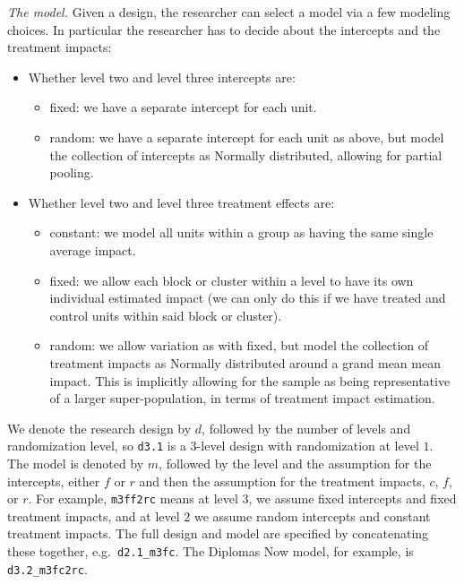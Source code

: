 \documentclass[
]{article}
\providecommand{\tightlist}{%
  \setlength{\itemsep}{0pt}\setlength{\parskip}{0pt}}
\begin{document}
\emph{The model.} Given a design, the researcher can select a model via
a few modeling choices. In particular the researcher has to decide about
the intercepts and the treatment impacts:

\begin{itemize}
\tightlist
\item
  Whether level two and level three intercepts are:

  \begin{itemize}
  \tightlist
  \item
    fixed: we have a separate intercept for each unit.
  \item
    random: we have a separate intercept for each unit as above, but
    model the collection of intercepts as Normally distributed, allowing
    for partial pooling.
  \end{itemize}
\item
  Whether level two and level three treatment effects are:

  \begin{itemize}
  \tightlist
  \item
    constant: we model all units within a group as having the same
    single average impact.
  \item
    fixed: we allow each block or cluster within a level to have its own
    individual estimated impact (we can only do this if we have treated
    and control units within said block or cluster).
  \item
    random: we allow variation as with fixed, but model the collection
    of treatment impacts as Normally distributed around a grand mean
    mean impact. This is implicitly allowing for the sample as being
    representative of a larger super-population, in terms of treatment
    impact estimation.
  \end{itemize}
\end{itemize}

We denote the research design by \(d\), followed by the number of levels
and randomization level, so \texttt{d3.1} is a \(3\)-level design with
randomization at level \(1\). The model is denoted by \(m\), followed by
the level and the assumption for the intercepts, either \(f\) or \(r\)
and then the assumption for the treatment impacts, \(c\), \(f\), or
\(r\). For example, \texttt{m3ff2rc} means at level \(3\), we assume
fixed intercepts and fixed treatment impacts, and at level \(2\) we
assume random intercepts and constant treatment impacts. The full design
and model are specified by concatenating these together,
e.g.~\texttt{d2.1\_m3fc}. The Diplomas Now model, for example, is
\texttt{d3.2\_m3fc2rc}.
\end{document}
